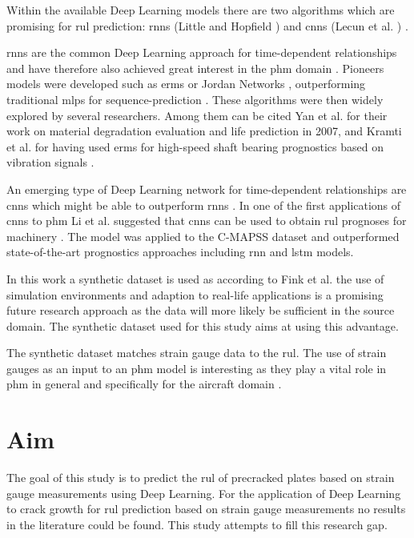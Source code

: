 \documentclass[conference]{IEEEtran}
\begin{document}
Within the available Deep Learning models there are two algorithms which are promising for \gls{rul} prediction: \glspl{rnn} (Little \cite{Little1996} and Hopfield  \cite{Hopfield1982}) and \glspl{cnn} (Lecun et al. \cite{Lecun1998}) \cite{Akrim2021}.

\glspl{rnn} are the common Deep Learning approach for time-dependent relationships and have therefore also achieved great interest in the \gls{phm} domain \cite{Akrim2021}. Pioneers models were developed such as \glspl{erm} \cite{Elman1990} or Jordan Networks \cite{Jordan1997}, outperforming traditional \glspl{mlp} for sequence-prediction \cite{Akrim2021}. These algorithms were then widely explored by several researchers. Among them can be cited Yan et al. \cite{Yan2007} for their work on material degradation evaluation and life prediction in 2007, and Kramti et al. \cite{Kramti2018} for having used \glspl{erm} for high-speed shaft bearing prognostics based on vibration signals \cite{Akrim2021}.

An emerging type of Deep Learning network for time-dependent relationships are \glspl{cnn} which might be able to outperform \glspl{rnn} \cite{Bai2018}. In one of the first applications of \glspl{cnn} to \gls{phm} Li et al. suggested that \glspl{cnn} can be used to obtain \gls{rul} prognoses for machinery \cite{Li2018}. The model was applied to the C-MAPSS dataset \cite{Saxena2008} and outperformed state-of-the-art prognostics approaches including \gls{rnn} and \gls{lstm} models.

In this work a synthetic dataset is used as according to Fink et al. \cite{Fink2020} the use of simulation environments and adaption to real-life applications is a promising future research approach as the data will more likely be sufficient in the source domain. The synthetic dataset used for this study aims at using this advantage.

The synthetic dataset matches strain gauge data to the \gls{rul}. The use of strain gauges as an input to an \gls{phm} model is interesting as they play a vital role in \gls{phm} in general \cite{Tinga2019} and specifically for the aircraft domain \cite{Timothy2009}.

\section{Aim}
\label{sec:aim}

The goal of this study is to predict the \gls{rul} of precracked plates based on strain gauge measurements using Deep Learning. 
For the application of Deep Learning to crack growth for \gls{rul} prediction based on strain gauge measurements no results in the literature could be found. This study attempts to fill this research gap.
\end{document}
